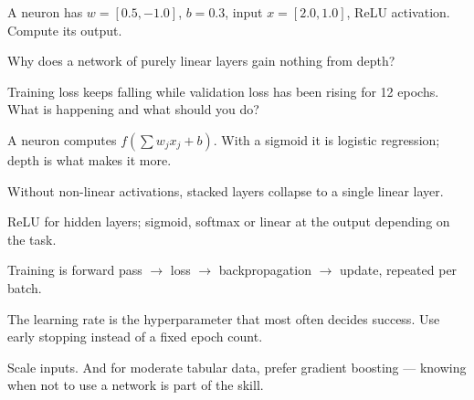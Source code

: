 \begin{checkpoint}
\begin{tightnum}
  \item A neuron has $w = [0.5, -1.0]$, $b = 0.3$, input $x = [2.0, 1.0]$, ReLU
        activation. Compute its output.
  \item Why does a network of purely linear layers gain nothing from depth?
  \item Training loss keeps falling while validation loss has been rising for 12
        epochs. What is happening and what should you do?
\end{tightnum}
\end{checkpoint}

\begin{chaptersummary}
\begin{tight}
  \item A neuron computes $f(\sum w_j x_j + b)$. With a sigmoid it is logistic
        regression; depth is what makes it more.
  \item Without non-linear activations, stacked layers collapse to a single linear
        layer.
  \item ReLU for hidden layers; sigmoid, softmax or linear at the output depending
        on the task.
  \item Training is forward pass $\rightarrow$ loss $\rightarrow$ backpropagation
        $\rightarrow$ update, repeated per batch.
  \item The learning rate is the hyperparameter that most often decides success.
        Use early stopping instead of a fixed epoch count.
  \item Scale inputs. And for moderate tabular data, prefer gradient boosting ---
        knowing when not to use a network is part of the skill.
\end{tight}
\end{chaptersummary}

